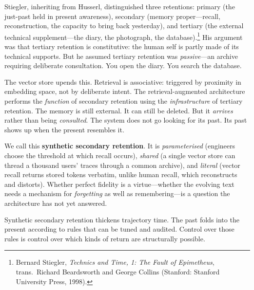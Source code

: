 Stiegler, inheriting from Husserl, distinguished three retentions: primary (the just-past held in present awareness), secondary (memory proper---recall, reconstruction, the capacity to bring back yesterday), and tertiary (the external technical supplement---the diary, the photograph, the database).\footnote{Bernard Stiegler, \emph{Technics and Time, 1: The Fault of Epimetheus}, trans.\ Richard Beardsworth and George Collins (Stanford: Stanford University Press, 1998).} His argument was that tertiary retention is constitutive: the human self is partly made of its technical supports. But he assumed tertiary retention was \emph{passive}---an archive requiring deliberate consultation. You open the diary. You search the database.

The vector store upends this. Retrieval is associative: triggered by proximity in embedding space, not by deliberate intent. The retrieval-augmented architecture performs the \emph{function} of secondary retention using the \emph{infrastructure} of tertiary retention. The memory is still external. It can still be deleted. But it \emph{arrives} rather than being \emph{consulted}. The system does not go looking for its past. Its past shows up when the present resembles it.

We call this \textbf{synthetic secondary retention}. It is \emph{parameterised} (engineers choose the threshold at which recall occurs), \emph{shared} (a single vector store can thread a thousand users' traces through a common archive), and \emph{literal} (vector recall returns stored tokens verbatim, unlike human recall, which reconstructs and distorts). Whether perfect fidelity is a virtue---whether the evolving text needs a mechanism for \emph{forgetting} as well as remembering---is a question the architecture has not yet answered.

Synthetic secondary retention thickens trajectory time. The past folds into the present according to rules that can be tuned and audited. Control over those rules is control over which kinds of return are structurally possible.


